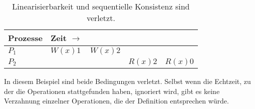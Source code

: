 \begin{table}
	\centering
		\begin{tabular}{l | l l l l}
		\textbf{Prozesse} & \textbf{Zeit} $\rightarrow$ \\
		\hline
		$P_{1}$ & $W(x)1$ & $W(x)2$ \\
		$P_{2}$ & & & \color{red} $R(x)2$ &  \color{red} $R(x)0$ \\
			
		\end{tabular}
	\caption{Linearisierbarkeit und sequentielle Konsistenz sind verletzt.}
	\label{tab:3}
\end{table}

In diesem Beispiel sind beide Bedingungen verletzt. Selbst wenn die Echtzeit, zu der die Operationen stattgefunden haben, ignoriert wird, gibt es keine Verzahnung einzelner Operationen, die der Definition entsprechen würde.